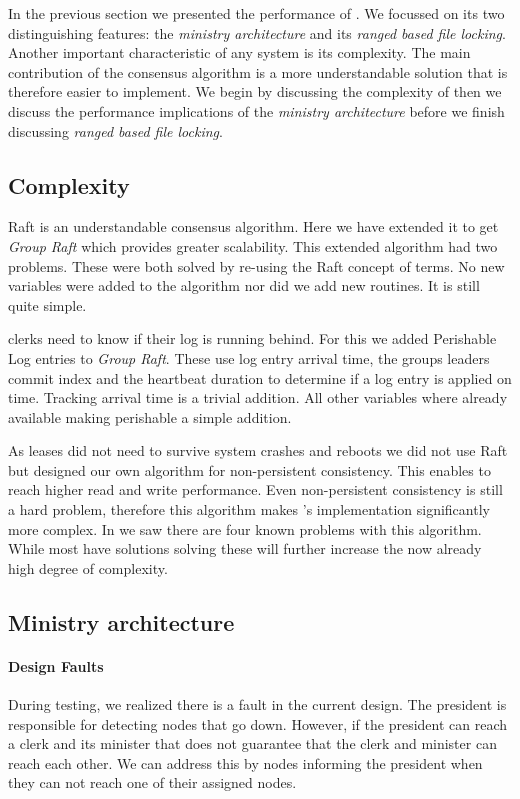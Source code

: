 In the previous section we presented the performance of \name{}. We focussed on its two distinguishing features: the \textit{ministry architecture} and its \textit{ranged based file locking}. Another important characteristic of any system is its complexity. The main contribution of the \raft{} consensus algorithm is a more understandable solution that is therefore easier to implement. We begin by discussing the complexity of \name{} then we discuss the performance implications of the \textit{ministry architecture} before we finish discussing \textit{ranged based file locking}.
%
\subsection{Complexity}
Raft is an understandable consensus algorithm. Here we have extended it to get \textit{Group Raft} which provides greater scalability. This extended algorithm had two problems. These were both solved by re-using the Raft concept of terms. No new variables were added to the algorithm nor did we add new routines. It is still quite simple. 

\Name{} clerks need to know if their log is running behind. For this we added Perishable Log entries to \textit{Group Raft}. These use log entry arrival time, the groups leaders commit index and the heartbeat duration to determine if a log entry is applied on time. Tracking arrival time is a trivial addition. All other variables where already available making perishable a simple addition.

As leases did not need to survive system crashes and reboots we did not use Raft but designed our own algorithm for non-persistent consistency. This enables \name{} to reach higher read and write performance. Even non-persistent consistency is still a hard problem, therefore this algorithm makes \name{}'s implementation significantly more complex. In  we saw there are four known problems with this algorithm. While most have solutions solving these will further increase the now already high degree of complexity.
%
\subsection{Ministry architecture}
\paragraph{Design Faults}
During testing, we realized there is a fault in the current design. The president is responsible for detecting nodes that go down. However, if the president can reach a clerk and its minister that does not guarantee that the clerk and minister can reach each other. We can address this by nodes informing the president when they can not reach one of their assigned nodes.
